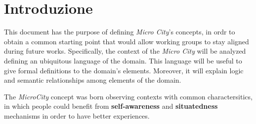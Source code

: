 \section*{Introduzione}
\label{sec:introduction}

This document has the purpose of defining \textit{Micro City}'s concepts, in ordr to obtain a common starting point that would allow working groups to stay aligned during future works. Specifically, the context of the \textit{Micro City} will be analyzed defining an ubiquitous language of the domain. This language will be useful to give formal definitions to the domain's elements. Moreover, it will explain logic and semantic relationships among elements of the domain.

The \textit{MicroCity} concept was born observing contexts with common charactersitics, in which people could benefit from \textbf{self-awareness} and \textbf{situatedness} mechanisms in order to have better experiences.
